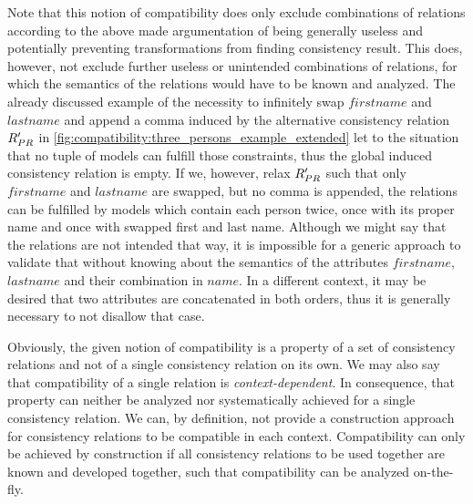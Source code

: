 Note that this notion of compatibility does only exclude combinations of relations according to the above made argumentation of being generally useless and potentially preventing transformations from finding consistency result.
This does, however, not exclude further useless or unintended combinations of relations, for which the semantics of the relations would have to be known and analyzed.
The already discussed example of the necessity to infinitely swap $firstname$ and $lastname$ and append a comma induced by the alternative consistency relation $R_{PR}'$ in \autoref{fig:compatibility:three_persons_example_extended} let to the situation that no tuple of models can fulfill those constraints, thus the global induced consistency relation is empty.
If we, however, relax $R_{PR}'$ such that only $firstname$ and $lastname$ are swapped, but no comma is appended, the relations can be fulfilled by models which contain each person twice, once with its proper name and once with swapped first and last name.
Although we might say that the relations are not intended that way, it is impossible for a generic approach to validate that without knowing about the semantics of the attributes $firstname$, $lastname$ and their combination in $name$.
In a different context, it may be desired that two attributes are concatenated in both orders, thus it is generally necessary to not disallow that case.

Obviously, the given notion of compatibility is a property of a set of consistency relations and not of a single consistency relation on its own.
We may also say that compatibility of a single relation is \emph{context-dependent}.
In consequence, that property can neither be analyzed nor systematically achieved for a single consistency relation.
We can, by definition, not provide a construction approach for consistency relations to be compatible in each context.
Compatibility can only be achieved by construction if all consistency relations to be used together are known and developed together, such that compatibility can be analyzed on-the-fly.

